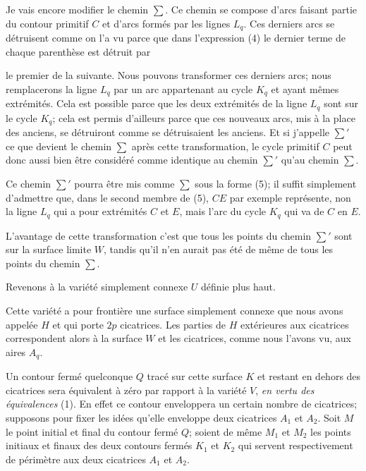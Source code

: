 \documentclass{article}
\begin{document}
Je vais encore modifier le chemin $\displaystyle\sum$. Ce chemin se compose d'arcs faisant partie du contour primitif $C$ et d'arcs formés par les lignes $L_{q}$. Ces derniers arcs se détruisent comme on l'a vu parce que dans l'expression (4) le dernier terme de chaque parenthèse est détruit par

le premier de la suivante. Nous pouvons transformer ces derniers arcs; nous remplacerons la ligne $L_{q}$ par un arc appartenant au cycle $K_{q}$ et ayant mêmes extrémités. Cela est possible parce que les deux extrémités de la ligne $L_{q}$ sont sur le cycle $K_{q}$; cela est permis d'ailleurs parce que ces nouveaux arcs, mis à la place des anciens, se détruiront comme se détruisaient les anciens. Et si j'appelle $\displaystyle\sum'$ ce que devient le chemin $\displaystyle\sum$ après cette transformation, le cycle primitif $C$ peut donc aussi bien être considéré comme identique au chemin $\displaystyle\sum'$ qu'au chemin $\displaystyle\sum$.

Ce chemin $\displaystyle\sum'$ pourra être mis comme $\displaystyle\sum$ sous la forme (5); il suffit simplement d'admettre que, dans le second membre de (5), $CE$ par exemple représente, non la ligne $L_{q}$ qui a pour extrémités $C$ et $E$, mais l'arc du cycle $K_{q}$ qui va de $C$ en $E$.

L'avantage de cette transformation c'est que tous les points du chemin $\displaystyle\sum'$ sont sur la surface limite $W$, tandis qu'il n'en aurait pas été de même de tous les points du chemin $\displaystyle\sum$.

Revenons à la variété simplement connexe $U$ définie plus haut.

Cette variété a pour frontière une surface simplement connexe que nous avons appelée $H$ et qui porte $2p$ cicatrices. Les parties de $H$ extérieures aux cicatrices correspondent alors à la surface $W$ et les cicatrices, comme nous l'avons vu, aux aires $A_{q}$.

Un contour fermé quelconque $Q$ tracé sur cette surface $K$ et restant en dehors des cicatrices sera équivalent à zéro par rapport à la variété $V$, \emph{en vertu des équivalences} (1). En effet ce contour enveloppera un certain nombre de cicatrices; supposons pour fixer les idées qu'elle enveloppe deux cicatrices $A_{1}$ et $A_{2}$. Soit $M$ le point initial et final du contour fermé $Q$; soient de même $M_{1}$ et $M_{2}$ les points initiaux et finaux des deux contours fermés $K_{1}$ et $K_{2}$ qui servent respectivement de périmètre aux deux cicatrices $A_{1}$ et $A_{2}$.
\end{document}
